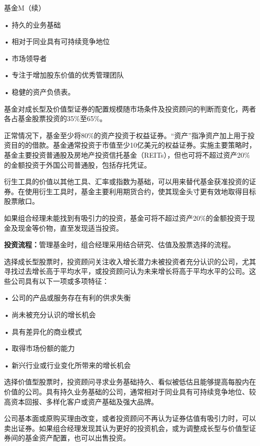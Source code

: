 \documentclass[UTF8,fontset=none,11pt,a4paper]{ctexart}
\begin{document}
\par{}\label{originalpage2}
基金M（续）

\noindent • 持久的业务基础\par\smallskip
\noindent • 相对于同业具有可持续竞争地位\par\smallskip
\noindent • 市场领导者\par\smallskip
\noindent • 专注于增加股东价值的优秀管理团队\par\smallskip
\noindent • 稳健的资产负债表。\par\smallskip
基金对成长型及价值型证券的配置规模随市场条件及投资顾问的判断而变化，两者各占基金股票投资的35\%至65\%。

正常情况下，基金至少将80\%的资产投资于权益证券。“资产”指净资产加上用于投资目的的借款。基金通常投资于市值至少10亿美元的权益证券。实施主要策略时，基金主要投资普通股及房地产投资信托基金（REITs），但也可将不超过资产20\%的金额投资于外国公司普通股，包括存托凭证。

衍生工具的价值以其他工具、汇率或指数为基础，可以用来替代基金获准投资的证券。在使用衍生工具时，基金主要利用期货合约，使其现金头寸更有效地取得目标股票敞口。

如果组合经理未能找到有吸引力的投资，基金可将不超过资产20\%的金额投资于现金及现金等价物，直至发现适当投资。

\textbf{投资流程：}管理基金时，组合经理采用结合研究、估值及股票选择的流程。

选择成长型股票时，投资顾问关注收入增长潜力未被投资者充分认识的公司，尤其寻找过去增长高于平均水平，或投资顾问认为未来增长将高于平均水平的公司。这些公司具有以下一项或多项特征：

\noindent • 公司的产品或服务存在有利的供求失衡\par\smallskip
\noindent • 尚未被充分认识的增长机会\par\smallskip
\noindent • 具有差异化的商业模式\par\smallskip
\noindent • 取得市场份额的能力\par\smallskip
\noindent • 新兴行业或行业变化所带来的增长机会\par\smallskip
选择价值型股票时，投资顾问寻求业务基础持久、看似被低估且能够提高每股内在价值的公司。具有持久业务基础的公司，通常相对于同业具有可持续竞争地位、较高资本回报、多样化客户或资产基础及强大品牌。

公司基本面或原购买理由改变，或者投资顾问不再认为证券估值有吸引力时，可以卖出证券。如果组合经理发现其认为更好的投资机会，或为调整成长型与价值型证券间的基金资产配置，也可以出售投资。
\end{document}
